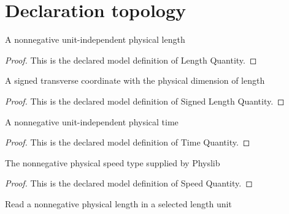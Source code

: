 \section{Declaration topology}
\begin{definition}
  \label{def:physics:phyx-mini-0124:phyxminiproblems-problemphyxmini0124-lengthquantity}
  A nonnegative unit-independent physical length
\end{definition}
\begin{proof}
  This is the declared model definition of Length Quantity.
\end{proof}
\begin{definition}
  \label{def:physics:phyx-mini-0124:phyxminiproblems-problemphyxmini0124-signedlengthquantity}
  A signed transverse coordinate with the physical dimension of length
\end{definition}
\begin{proof}
  This is the declared model definition of Signed Length Quantity.
\end{proof}
\begin{definition}
  \label{def:physics:phyx-mini-0124:phyxminiproblems-problemphyxmini0124-timequantity}
  A nonnegative unit-independent physical time
\end{definition}
\begin{proof}
  This is the declared model definition of Time Quantity.
\end{proof}
\begin{definition}
  \label{def:physics:phyx-mini-0124:phyxminiproblems-problemphyxmini0124-speedquantity}
  The nonnegative physical speed type supplied by Physlib
\end{definition}
\begin{proof}
  This is the declared model definition of Speed Quantity.
\end{proof}
\begin{definition}
  \label{def:physics:phyx-mini-0124:phyxminiproblems-problemphyxmini0124-lengthreadout}
  Read a nonnegative physical length in a selected length unit
\end{definition}
